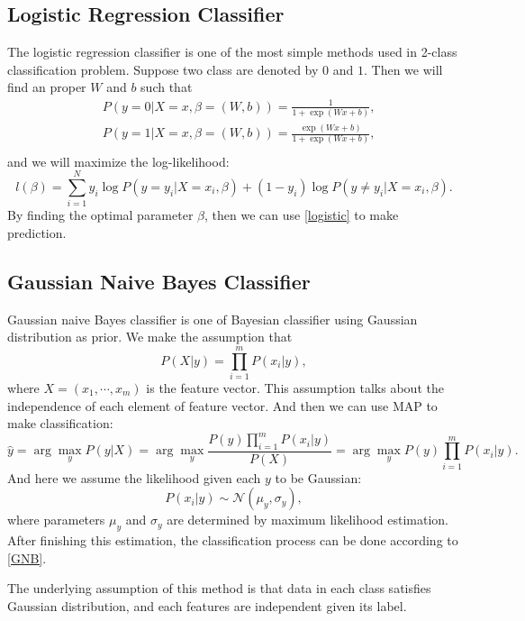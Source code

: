 \documentclass[english]{article}
\begin{document}
\subsection{Logistic Regression Classifier}
\par The logistic regression classifier is one of the most simple methods used in 2-class classification problem. Suppose two class are denoted by $0$ and $1$. Then we will find an proper $W$ and $b$ such that
\begin{equation}\label{logistic}
	\begin{aligned}
		&P(y=0|X=x, \beta=(W, b)) = \frac{1}{1 + \exp(Wx+b)},\\
		&P(y=1|X=x, \beta=(W, b)) = \frac{\exp(Wx+b)}{1 + \exp(Wx+b)},\\
	\end{aligned}
\end{equation}
and we will maximize the log-likelihood:
\begin{equation}
	l(\beta) = \sum_{i=1}^{N}y_{i}\log P(y=y_{i}|X=x_{i}, \beta) + (1-y_{i})\log P(y\neq y_{i}|X=x_{i}, \beta).
\end{equation}
By finding the optimal parameter $\beta$, then we can use \eqref{logistic} to make prediction.

\subsection{Gaussian Naive Bayes Classifier}
\par Gaussian naive Bayes classifier is one of Bayesian classifier using Gaussian distribution as prior. We make the assumption that
\begin{equation}
	P(X|y) = \prod_{i=1}^{m}P(x_{i}|y),
\end{equation}
where $X = (x_{1}, \cdots, x_{m})$ is the feature vector. This assumption talks about the independence of each element of feature vector. And then we can use MAP to make classification:
\begin{equation}\label{GNB}
	\hat{y} = \arg\max_{y}P(y|X) = \arg\max_{y}\frac{P(y)\prod_{i=1}^{m}P(x_{i}|y)}{P(X)} = \arg\max_{y}P(y)\prod_{i=1}^{m}P(x_{i}|y).
\end{equation}
And here we assume the likelihood given each $y$ to be Gaussian:
\begin{equation}
	P(x_{i}|y)\sim\mathcal{N}(\mu_{y}, \sigma_{y}),
\end{equation}
where parameters $\mu_{y}$ and $\sigma_{y}$ are determined by maximum likelihood estimation. After finishing this estimation, the classification process can be done according to \eqref{GNB}.
\par The underlying assumption of this method is that data in each class satisfies Gaussian distribution, and each features are independent given its label.
\end{document}
